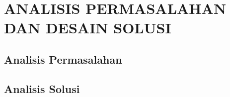 \chapter{ANALISIS PERMASALAHAN DAN DESAIN SOLUSI}

\section{Analisis Permasalahan}



\section{Analisis Solusi}

